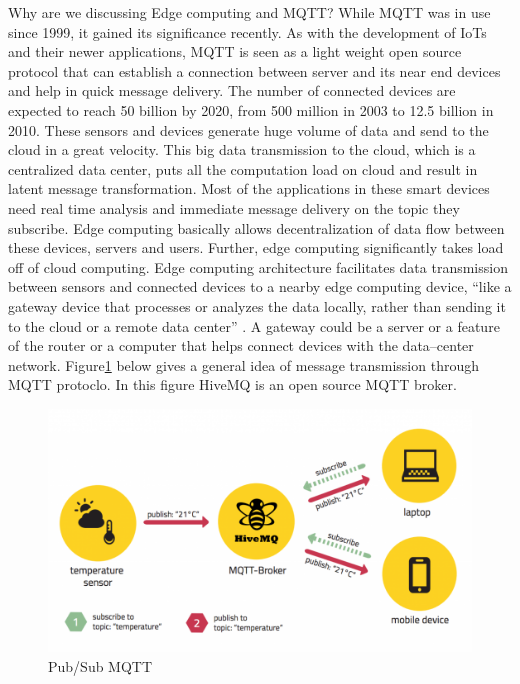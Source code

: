 \documentclass[sigconf]{acmart}
\begin{document}
Why are we discussing Edge computing and MQTT? While MQTT was in use since 1999, it gained its significance recently. As with the development of IoTs and their newer applications, MQTT is seen as a light weight open source protocol that can establish a connection between server and its near end devices and help in quick message delivery. The number of connected devices are expected to reach 50 billion by 2020, from 500 million in 2003 to 12.5 billion in 2010. These sensors and devices generate huge volume of data and send to the cloud in a great velocity. This big data transmission to the cloud, which is a centralized data center, puts all the computation load on cloud and result in latent message transformation. Most of the applications in these smart devices need real time analysis and immediate message delivery on the topic they subscribe. Edge computing basically allows decentralization of data flow between these devices, servers and users. Further, edge computing significantly takes load off of cloud computing. Edge computing architecture facilitates data transmission between sensors and connected devices to a nearby edge computing device, ``like a gateway device that processes or analyzes the data locally, rather than sending it to the cloud or a remote data center'' \cite{www-rtinsights-com}. A gateway could be a server or a feature of the router or a computer that helps connect devices with the data--center network.
Figure\ref{p:Pub/Sub MQTT} below gives a general idea of message transmission through MQTT protoclo. In this figure HiveMQ is an open source MQTT broker. 

\begin{figure}
\includegraphics[width=1.0\columnwidth]{images/pubsubmqtt.png}
\caption{Pub/Sub MQTT}\label{p:Pub/Sub MQTT}
\end{figure}
\end{document}
